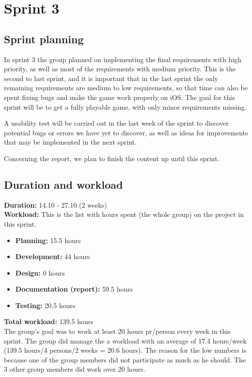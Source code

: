 \section{Sprint 3}

\subsection{Sprint planning}
	In sprint 3 the group planned on implementing the final requirements with high priority, as well as most of the requirements with medium priority. This is the second to last sprint, and it is important that in the last sprint the  only remaining requirements are medium to low requirements, so that time can also be spent fixing bugs and make the game work properly on iOS. The goal for this sprint will be to get a fully playable game, with only minor requirements missing.

	A usability test will be carried out in the last week of the sprint to discover potential bugs or errors we have yet to discover, as well as ideas for improvements that may be implemented in the next sprint.

	Concerning the report, we plan to finish the content up until this sprint.

\subsection{Duration and workload}
	
	{\bf Duration:} 14.10 - 27.10 (2 weeks)\\
	{\bf Workload:} This is the list with hours spent (the whole group) on the project in this sprint.
	\begin{itemize}
		\item {\bf Planning:} 15.5 hours
		\item {\bf Development:} 44 hours
		\item {\bf Design:} 0 hours
		\item {\bf Documentation (report):} 59.5 hours
		\item {\bf Testing:} 20.5 hours 
	\end{itemize}
	{\bf Total workload: } 139.5 hours \\
	The group's goal was to work at least 20 hours pr/person every week in this sprint. 
	The group did manage the a workload with an average of 17.4 hours/week (139.5 hours/4 persons/2 weeks = 20.6 hours). The reason for the low numbers is because one of the group members did not
	participate as much as he should. The 3 other group members did work over 20 hours. 



